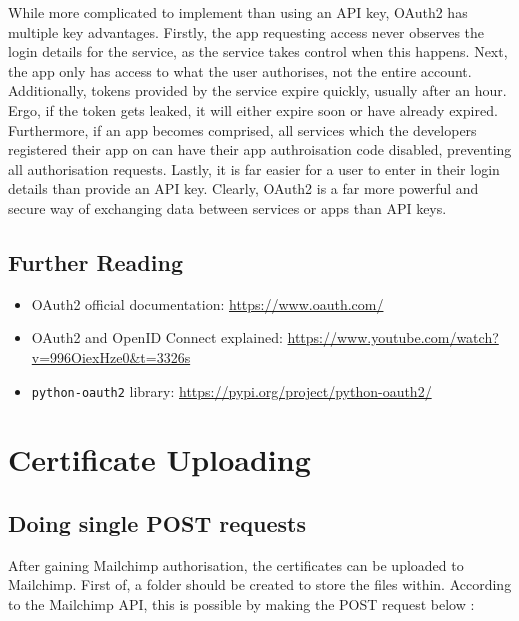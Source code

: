 \documentclass[11pt]{article}
\begin{document}
While more complicated to implement than using an API key, OAuth2 has multiple key advantages. Firstly, the app requesting access never observes the login details for the service, as the service takes control when this happens. Next, the app only has access to what the user authorises, not the entire account. Additionally, tokens provided by the service expire quickly, usually after an hour. Ergo, if the token gets leaked, it will either expire soon or have already expired. Furthermore, if an app becomes comprised, all services which the developers registered their app on can have their app authroisation code disabled, preventing all authorisation requests. Lastly, it is far easier for a user to enter in their login details than provide an API key. Clearly, OAuth2 is a far more powerful and secure way of exchanging data between services or apps than API keys.

\subsection{Further Reading}

\begin{itemize}
    \item OAuth2 official documentation: \url{https://www.oauth.com/}
    \item OAuth2 and OpenID Connect explained: \url{https://www.youtube.com/watch?v=996OiexHze0&t=3326s}
    \item \texttt{python-oauth2} library: \url{https://pypi.org/project/python-oauth2/}
\end{itemize}

\newpage

\section{Certificate Uploading}

\subsection{Doing single POST requests}

After gaining Mailchimp authorisation, the certificates can be uploaded to Mailchimp. First of, a folder should be created to store the files within. According to the Mailchimp API, this is possible by making the POST request below \cite{mailchimp-add-folder}:

\inputminted[linenos=true]{python}{mailchimp_examples/create_folder.py}
\end{document}
